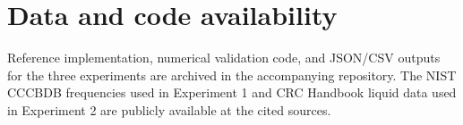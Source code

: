 \documentclass[11pt,twocolumn,a4paper]{article}
\theoremstyle{definition}
\theoremstyle{remark}
\begin{document}
\section*{Data and code availability}

Reference implementation, numerical validation code, and JSON/CSV outputs for the three experiments are archived in the accompanying repository. The NIST CCCBDB frequencies used in Experiment 1 and CRC Handbook liquid data used in Experiment 2 are publicly available at the cited sources.



\end{document}

